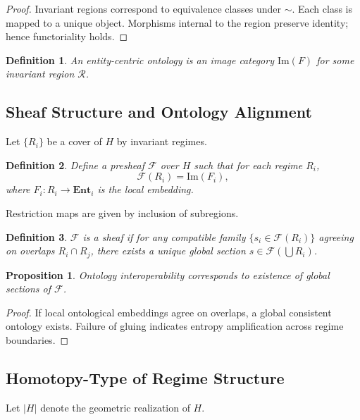 \documentclass[12pt]{article}
\newtheorem{proposition}{Proposition}
\newtheorem{definition}{Definition}
\begin{document}
\begin{proof}
Invariant regions correspond to equivalence classes under $\sim$. Each class is mapped to a unique object. Morphisms internal to the region preserve identity; hence functoriality holds.
\end{proof}

\begin{definition}
An entity-centric ontology is an image category $\mathrm{Im}(F)$ for some invariant region $\mathcal{R}$.
\end{definition}

\subsection{Sheaf Structure and Ontology Alignment}

Let $\{R_i\}$ be a cover of $H$ by invariant regimes.

\begin{definition}
Define a presheaf $\mathcal{F}$ over $H$ such that for each regime $R_i$,
\[
\mathcal{F}(R_i) = \mathrm{Im}(F_i),
\]
where $F_i : R_i \to \mathbf{Ent}_i$ is the local embedding.
\end{definition}

Restriction maps are given by inclusion of subregions.

\begin{definition}
$\mathcal{F}$ is a sheaf if for any compatible family $\{s_i \in \mathcal{F}(R_i)\}$ agreeing on overlaps $R_i \cap R_j$, there exists a unique global section $s \in \mathcal{F}(\bigcup R_i)$.
\end{definition}

\begin{proposition}
Ontology interoperability corresponds to existence of global sections of $\mathcal{F}$.
\end{proposition}

\begin{proof}
If local ontological embeddings agree on overlaps, a global consistent ontology exists. Failure of gluing indicates entropy amplification across regime boundaries.
\end{proof}

\subsection{Homotopy-Type of Regime Structure}

Let $|H|$ denote the geometric realization of $H$.
\end{document}
